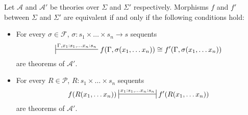 \documentclass[reqno]{amsart}
\theoremstyle{definition}
\theoremstyle{remark}
\numberwithin{figure}{section}
\begin{document}
\begin{prop}[mor-eq]
Let $\mathcal{A}$ and $\mathcal{A}'$ be theories over $\Sigma$ and $\Sigma'$ respectively.
Morphisms $f$ and $f'$ between $\Sigma$ and $\Sigma'$ are equivalent if and only if the following conditions hold:
\begin{itemize}
\item For every $\sigma \in \mathcal{F}$, $\sigma : s_1 \times \ldots \times s_n \to s$ sequents
\[ \sststile{}{\Gamma, x_1 : s_1, \ldots x_n : s_n} f(\Gamma, \sigma(x_1, \ldots x_n)) \cong f'(\Gamma, \sigma(x_1, \ldots x_n)) \]
are theorems of $\mathcal{A}'$.
\item For every $R \in \mathcal{P}$, $R : s_1 \times \ldots \times s_n$ sequents
\[ f(R(x_1, \ldots x_n)) \ssststile{}{x_1 : s_1, \ldots x_n : s_n} f'(R(x_1, \ldots x_n)) \]
are theorems of $\mathcal{A}'$.
\end{itemize}
\end{prop}
\end{document}
